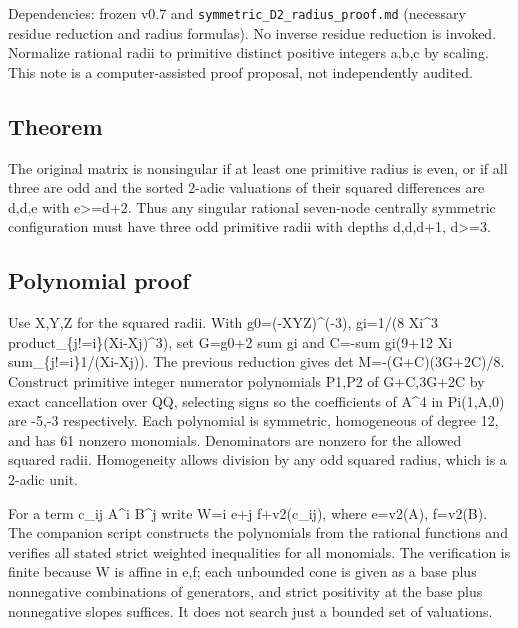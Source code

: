 \documentclass[
  10pt,
]{article}
\begin{document}
Dependencies: frozen v0.7 and \texttt{symmetric\_D2\_radius\_proof.md}
(necessary residue reduction and radius formulas). No inverse residue
reduction is invoked. Normalize rational radii to primitive distinct
positive integers a,b,c by scaling. This note is a computer-assisted
proof proposal, not independently audited.

\subsection{Theorem}\label{theorem}

The original matrix is nonsingular if at least one primitive radius is
even, or if all three are odd and the sorted 2-adic valuations of their
squared differences are d,d,e with e\textgreater=d+2. Thus any singular
rational seven-node centrally symmetric configuration must have three
odd primitive radii with depths d,d,d+1, d\textgreater=3.

\subsection{Polynomial proof}\label{polynomial-proof}

Use X,Y,Z for the squared radii. With g0=(-XYZ)\^{}(-3), gi=1/(8 Xi\^{}3
product\_\{j!=i\}(Xi-Xj)\^{}3), set G=g0+2 sum gi and C=-sum gi(9+12 Xi
sum\_\{j!=i\}1/(Xi-Xj)). The previous reduction gives det
M=-(G+C)(3G+2C)/8. Construct primitive integer numerator polynomials
P1,P2 of G+C,3G+2C by exact cancellation over QQ, selecting signs so the
coefficients of A\^{}4 in Pi(1,A,0) are -5,-3 respectively. Each
polynomial is symmetric, homogeneous of degree 12, and has 61 nonzero
monomials. Denominators are nonzero for the allowed squared radii.
Homogeneity allows division by any odd squared radius, which is a 2-adic
unit.

For a term c\_ij A\^{}i B\^{}j write W=i e+j f+v2(c\_ij), where e=v2(A),
f=v2(B). The companion script constructs the polynomials from the
rational functions and verifies all stated strict weighted inequalities
for all monomials. The verification is finite because W is affine in
e,f; each unbounded cone is given as a base plus nonnegative
combinations of generators, and strict positivity at the base plus
nonnegative slopes suffices. It does not search just a bounded set of
valuations.
\end{document}
